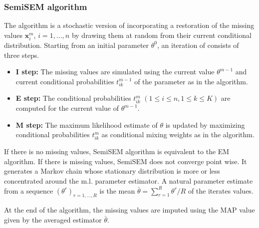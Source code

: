 \documentclass[shortnames,nojss,article]{jss}
\newcommand{\bx}{\mathbf{x}}
\begin{document}
\subsubsection{SemiSEM algorithm}\label{subsubsec:SemiSEM}
The  algorithm is a stochastic version of  incorporating
a restoration of the missing values $\bx_i^m$, $i=1,\ldots,n$ by drawing them at
random from their current conditional distribution. Starting from an initial
parameter $\theta^0$, an iteration of  consists of three steps.
\begin{itemize}
\item {\bf I step:} The missing values are simulated using the current value
$\theta^{m-1}$ and current conditional probabilities $t^{m-1}_{ik}$ of the
parameter as in the  algorithm.

\item {\bf E step:} The conditional probabilities $t^m_{ik}$ $(1 \leq i \leq n,
1 \leq k \leq K)$ are computed for the current value of $\theta^{m-1}$.

\item {\bf M step:} The maximum likelihood estimate of $\theta$ is updated
by maximizing conditional probabilities $t^m_{ik}$ as conditional
mixing weights as in the  algorithm.
\end{itemize}

If there is no missing values, SemiSEM algorithm is equivalent to the EM
algorithm. If there is missing values, SemiSEM does not converge point wise. It
generates a Markov chain whose stationary distribution is more or less
concentrated around the m.l. parameter estimator. A natural parameter estimate
from a  sequence $(\theta^r)_{r=1, \ldots,R}$ is the mean
$\bar{\theta}=\sum_{r=1}^R \theta^r/R$ of the iterates values.

At the end of the algorithm, the missing values are imputed using the
MAP value given by the averaged estimator $\bar{\theta}$.
\end{document}
